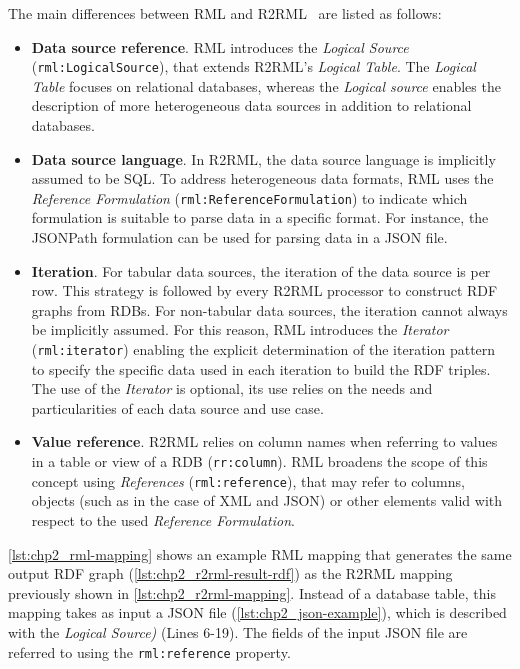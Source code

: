The main differences between RML and R2RML~\parencite{dimou2020rml-r2rml-diffs} are listed as follows:
\begin{itemize}
    \item \textbf{Data source reference}. RML introduces the \textit{Logical Source} (\texttt{rml:LogicalSource}), that extends R2RML's \textit{Logical Table}. The \textit{Logical Table} focuses on relational databases, whereas the \textit{Logical source} enables the description of more heterogeneous data sources in addition to relational databases.

    \item \textbf{Data source language}. In R2RML, the data source language is implicitly assumed to be SQL. To address heterogeneous data formats, RML uses the \textit{Reference Formulation} (\texttt{rml:ReferenceFormulation}) to indicate which formulation is suitable to parse data in a specific format. For instance, the JSONPath formulation can be used for parsing data in a JSON file. 

    \item \textbf{Iteration}. For tabular data sources, the iteration of the data source is per row. This strategy is followed by every R2RML processor to construct RDF graphs from RDBs. For non-tabular data sources, the iteration cannot always be implicitly assumed. For this reason, RML introduces the \textit{Iterator} (\texttt{rml:iterator}) enabling the explicit determination of the iteration pattern to specify the specific data used in each iteration to build the RDF triples. The use of the \textit{Iterator} is optional, its use relies on the needs and particularities of each data source and use case.

    \item \textbf{Value reference}. R2RML relies on column names when referring to values in a table or view of a RDB (\texttt{rr:column}). RML broadens the scope of this concept using \textit{References} (\texttt{rml:reference}), that may refer to columns, objects (such as in the case of XML and JSON) or other elements valid with respect to the used \textit{Reference Formulation}. 
\end{itemize}


\cref{lst:chp2_rml-mapping} shows an example RML mapping that generates the same output RDF graph (\cref{lst:chp2_r2rml-result-rdf}) as the R2RML mapping previously shown in \cref{lst:chp2_r2rml-mapping}. Instead of a database table, this mapping takes as input a JSON file (\cref{lst:chp2_json-example}), which is described with the \textit{Logical Source)} (Lines 6-19). The fields of the input JSON file are referred to using the \texttt{rml:reference} property. 

